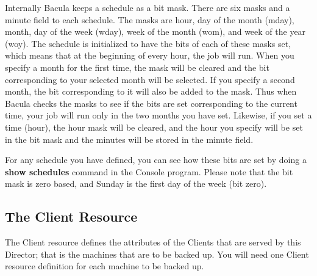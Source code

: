 Internally Bacula keeps a schedule as a bit mask. There are six masks and a
minute field to each schedule. The masks are hour, day of the month (mday),
month, day of the week (wday), week of the month (wom), and week of the year
(woy). The schedule is initialized to have the bits of each of these masks
set, which means that at the beginning of every hour, the job will run. When
you specify a month for the first time, the mask will be cleared and the bit
corresponding to your selected month will be selected. If you specify a second
month, the bit corresponding to it will also be added to the mask. Thus when
Bacula checks the masks to see if the bits are set corresponding to the
current time, your job will run only in the two months you have set. Likewise,
if you set a time (hour), the hour mask will be cleared, and the hour you
specify will be set in the bit mask and the minutes will be stored in the
minute field. 

For any schedule you have defined, you can see how these bits are set by doing
a {\bf show schedules} command in the Console program. Please note that the
bit mask is zero based, and Sunday is the first day of the week (bit zero). 



\subsection*{The Client Resource}
\label{ClientResource2}

The Client resource defines the attributes of the Clients that are served by
this Director; that is the machines that are to be backed up. You will need
one Client resource definition for each machine to be backed up. 

